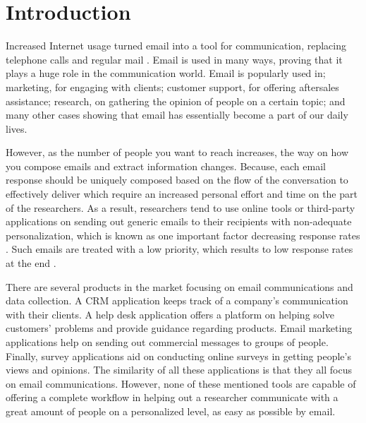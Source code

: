 \clearemptydoublepage
{}

\chapter{Introduction}
\label{chp:Intro}
Increased Internet usage turned email into a tool for communication, replacing telephone calls and regular mail \citep{Norman2000,Madden2003}. Email is used in many ways, proving that it plays a huge role in the communication world. Email is popularly used in; marketing, for engaging with clients; customer support, for offering aftersales assistance; research, on gathering the opinion of people on a certain topic; and many other cases showing that email has essentially become a part of our daily lives.
\vspace{1cm}

However, as the number of people you want to reach increases, the way on how you compose emails and extract information changes. Because, each email response should be uniquely composed based on the flow of the conversation to effectively deliver which require an increased personal effort and time on the part of the researchers. As a result, researchers tend to use online tools or third-party applications on sending out generic emails to their recipients with non-adequate personalization, which is known as one important factor decreasing response rates \citep{Dillman1991,Schaefer1998}. Such emails are treated with a low priority, which results to low response rates at the end \citep[page 272]{DillmanDonA.SmythJoleneD.Christian2009}.
\vspace{1cm}

There are several products in the market focusing on email communications and data collection. A \ac{CRM} application keeps track of a company's communication with their clients. A help desk application offers a platform on helping solve customers' problems and provide guidance regarding products. Email marketing applications help on sending out commercial messages to groups of people. Finally, survey applications aid on conducting online surveys in getting people's views and opinions. The similarity of all these applications is that they all focus on email communications. However, none of these mentioned tools are capable of offering a complete workflow in helping out a researcher communicate with a great amount of people on a personalized level, as easy as possible by email.
\vspace{1cm}

